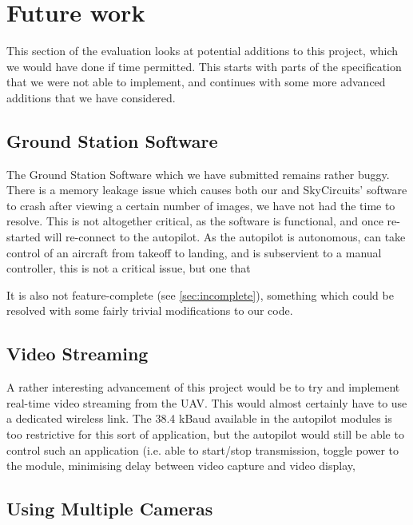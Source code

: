\section{Future work}

This section of the evaluation looks at potential additions to this project, 
which we would have done if time permitted. This starts with parts of the 
specification that we were not able to implement, and continues with some 
more advanced additions that we have considered.

\subsection{Ground Station Software}

The Ground Station Software which we have submitted remains rather buggy. 
There is a memory leakage issue which causes both our and SkyCircuits' 
software to crash after viewing a certain number of images, we have not had the time to resolve. This is not altogether critical, as the software 
is functional, and once re-started will re-connect to the autopilot. 
As the autopilot is autonomous, can take control of an aircraft from takeoff 
to landing, and is subservient to a manual controller, this is not a critical 
issue, but one that 

It is also not feature-complete (see \ref{sec:incomplete}), something which 
could be resolved with some fairly trivial modifications to our code.



\subsection{Video Streaming}

A rather interesting advancement of this project would be to try and implement 
real-time video streaming from the UAV. This would almost certainly have to use 
a dedicated wireless link. The 38.4 kBaud available in the autopilot modules 
is too restrictive for this sort of application, but the autopilot would still 
be able to control such an application (i.e. able to start/stop transmission, 
toggle power to the module, minimising delay between video capture and video 
display, 

\subsection{Using Multiple Cameras}

